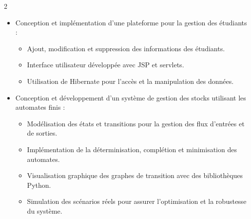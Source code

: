 \documentclass[10pt,a4paper,ragged2e,withhyper]{altacv}
\begin{document}
\begin{paracol}{2}
\divider

\begin{itemize}
\item Conception et implémentation d'une plateforme pour la gestion des étudiants :
  \begin{itemize}
    \item Ajout, modification et suppression des informations des étudiants.
    \item Interface utilisateur développée avec JSP et servlets.
    \item Utilisation de Hibernate pour l'accès et la manipulation des données.
  \end{itemize}
\end{itemize}

\divider

\begin{itemize}
\item Conception et développement d'un système de gestion des stocks utilisant les automates finis :
  \begin{itemize}
    \item Modélisation des états et transitions pour la gestion des flux d'entrées et de sorties.
    \item Implémentation de la déterminisation, complétion et minimisation des automates.
    \item Visualisation graphique des graphes de transition avec des bibliothèques Python.
    \item Simulation des scénarios réels pour assurer l'optimisation et la robustesse du système.
  \end{itemize}
\end{itemize}





\switchcolumn





{\LaTeXraggedright 
{}     
   \par}

\divider\smallskip


\end{paracol}
\end{document}
